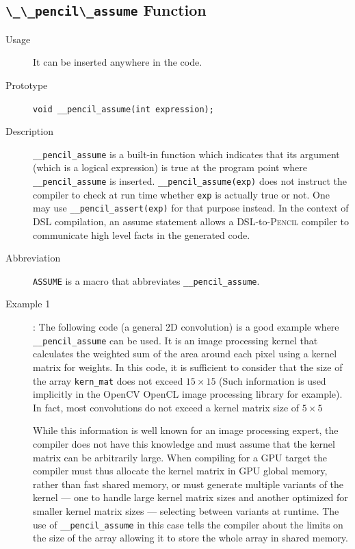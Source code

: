\documentclass{carp}
\newcommand\pencil{\textsc{Pencil}\xspace}
\begin{document}
\subsection{\lstinline!\_\_pencil\_assume! Function}
\begin{description}
\item [Usage] It can be inserted anywhere in the code.
\item [Prototype] \lstinline!void __pencil_assume(int expression);!
\item [Description] \lstinline!__pencil_assume! is a built-in function
  which indicates that its argument (which is a logical expression) is true at
  the program point where \lstinline!__pencil_assume! is inserted.
  \lstinline!__pencil_assume(exp)! does not instruct the compiler to check at
  run time whether \lstinline!exp! is actually true or not.
  One may use \lstinline!__pencil_assert(exp)! for that purpose instead.
  In the context of DSL compilation, an assume statement allows a
  DSL-to-\pencil compiler to communicate high level facts in the generated
  code.

\item [Abbreviation] \lstinline!ASSUME! is a macro that abbreviates
  \lstinline!__pencil_assume!.
  
\item [{Example 1}]:
The following code (a general 2D convolution)  is a
good example where \lstinline!__pencil_assume! can be used.  It is an image
processing kernel that calculates the weighted sum of the area around each
pixel using a kernel matrix for weights.
In this code, it is sufficient to consider that the size of the array
\lstinline!kern_mat! does not exceed $15\times15$ (Such information is
used implicitly in the OpenCV OpenCL image processing library for example).
In fact, most convolutions do not exceed a kernel matrix size of $5\times5$

While this information is well known for an image processing expert, the
compiler does not have this knowledge and must assume that the kernel matrix
can be arbitrarily large.  When compiling for a GPU target the compiler must
thus allocate the kernel matrix in GPU global memory, rather than fast shared
memory, or must generate multiple variants of the kernel --- one to handle large
kernel matrix sizes and another optimized for smaller kernel matrix
sizes --- selecting between variants at runtime.
The use of \lstinline!__pencil_assume! in this case tells the compiler
about the limits on the size of the array allowing it to store
the whole array in shared memory.


\end{description}
\end{document}

